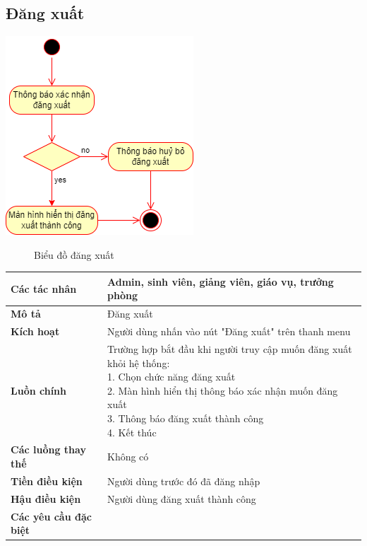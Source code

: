 \subsection{Đăng xuất}
\begin{center}
	\includegraphics[width=.7\textwidth]{../drawio/activity/logout.png}
	\begin{figure}[h]
		\centering
		\caption{Biểu đồ đăng xuất}
	\end{figure}
\end{center}
\begin{tabular}{|l|l|}
	\hline
	\textbf{Các tác nhân}         & Admin, sinh viên, giảng viên, giáo vụ, trưởng phòng                              \\
	\hline
	\textbf{Mô tả}                & Đăng xuất                                                                        \\
	\hline
	\textbf{Kích hoạt}            & Người dùng nhấn vào nút "Đăng xuất" trên thanh menu                              \\
	\hline
	\textbf{Luồn chính}           & \makecell[l]{Trường hợp bắt đầu khi người truy cập muốn đăng xuất khỏi hệ thống: \\ 1. Chọn chức năng đăng xuất \\ 2. Màn hình hiển thị thông báo xác nhận muốn đăng xuất \\ 3. Thông báo đăng xuất thành công \\ 4. Kết thúc} \\
	\hline
	\textbf{Các luồng thay thế}   & Không có                                                                         \\
	\hline
	\textbf{Tiền điều kiện}       & Người dùng trước đó đã đăng nhập                                                 \\
	\hline
	\textbf{Hậu điều kiện}        & Người dùng đăng xuất thành công                                                  \\
	\hline
	\textbf{Các yêu cầu đặc biệt} &                                                                                  \\
	\hline
\end{tabular}

